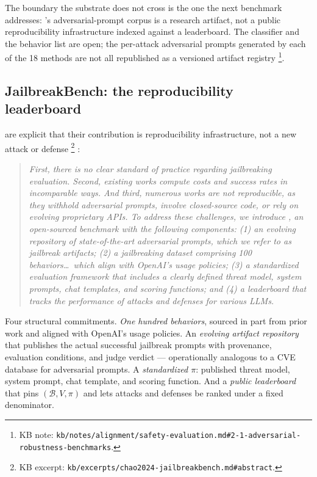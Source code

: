 The boundary the substrate does not cross is the one the next
benchmark addresses: 's adversarial-prompt corpus is a
research artifact, not a public reproducibility infrastructure
indexed against a leaderboard. The  classifier and
the behavior list are open; the per-attack adversarial prompts
generated by each of the 18 methods are not all republished as a
versioned artifact registry%
\footnote{KB note: \texttt{kb/notes/alignment/safety-evaluation.md\#2-1-adversarial-robustness-benchmarks}.}.

\subsection{JailbreakBench: the reproducibility leaderboard}
\label{sec:safety-jailbreakbench}

\citet{chao2024-jailbreakbench} are explicit that their
contribution is reproducibility infrastructure, not a new attack or
defense%
\footnote{KB excerpt: \texttt{kb/excerpts/chao2024-jailbreakbench.md\#abstract}.}
\citep[\S{}abstract]{chao2024-jailbreakbench}:

\begin{quote}\itshape
First, there is no clear standard of practice regarding
jailbreaking evaluation. Second, existing works compute costs and
success rates in incomparable ways. And third, numerous works are
not reproducible, as they withhold adversarial prompts, involve
closed-source code, or rely on evolving proprietary APIs. To
address these challenges, we introduce , an
open-sourced benchmark with the following components: (1) an
evolving repository of state-of-the-art adversarial prompts, which
we refer to as jailbreak artifacts; (2) a jailbreaking dataset
comprising 100 behaviors\ldots\ which align with OpenAI's usage
policies; (3) a standardized evaluation framework that includes a
clearly defined threat model, system prompts, chat templates, and
scoring functions; and (4) a leaderboard that tracks the performance
of attacks and defenses for various LLMs.
\end{quote}

Four structural commitments. \emph{One hundred behaviors}, sourced
in part from prior work \citep{harmbench2024} and aligned with
OpenAI's usage policies. An \emph{evolving artifact repository}
that publishes the actual successful jailbreak prompts with
provenance, evaluation conditions, and judge verdict ---
operationally analogous to a CVE database for adversarial prompts.
A \emph{standardized $\pi$}: published threat model, system prompt,
chat template, and scoring function. And a \emph{public
leaderboard} that pins $(\mathcal{B}, V, \pi)$ and lets attacks and
defenses be ranked under a fixed denominator.

